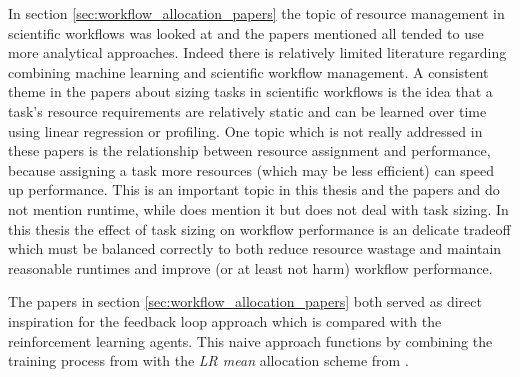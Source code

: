 In section \ref{sec:workflow_allocation_papers} the topic of resource management in scientific workflows was looked at and the papers mentioned all tended to use more analytical approaches. Indeed there is relatively limited literature regarding combining machine learning and scientific workflow management. A consistent theme in the papers about sizing tasks in scientific workflows is the idea that a task’s resource requirements are relatively static and can be learned over time using linear regression or profiling.  One topic which is not really addressed in these papers is the relationship between resource assignment and performance, because assigning a task more resources (which may be less efficient) can speed up performance. This is an important topic in this thesis and the papers \cite{FeedbackBasedAllocation} and \cite{tovarjob} do not mention runtime, while \cite{tarema} does mention it but does not deal with task sizing. In this thesis the effect of task sizing on workflow performance is an delicate tradeoff which must be balanced correctly to both reduce resource wastage and maintain reasonable runtimes and improve (or at least not harm) workflow performance.

The papers \cite{FeedbackBasedAllocation,tovarjob}in section \ref{sec:workflow_allocation_papers} both served as direct inspiration for the feedback loop approach which is compared with the reinforcement learning agents. This naive approach functions by combining the training process from \cite{tovarjob} with the \textit{LR mean} allocation scheme from \cite{FeedbackBasedAllocation}.

